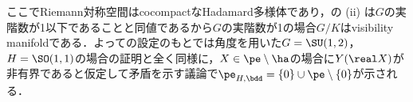 ここでRiemann対称空間はcocompactなHadamard多様体であり，の (ii) は$G$の実階数が1以下であることと同値であるから$G$の実階数が1の場合$G/K$はvisibility manifoldである．よっての設定のもとでは角度を用いた$G = \SU(1,2) $，$H= \SO(1,1)$の場合の証明と全く同様に，$X\in \pe\setminus\ha $の場合に$Y(\real X) $が非有界であると仮定して矛盾を示す議論で$\pe_{H,\bdd} =\{0\}\cup\pe\setminus\{0\} $が示される．
